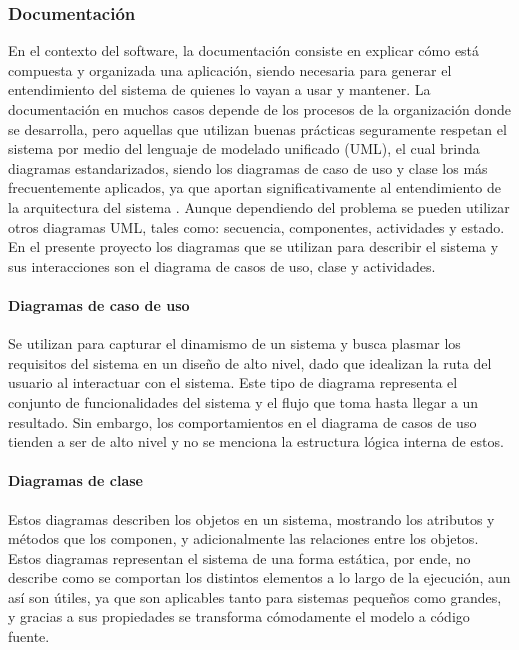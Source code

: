 \subsubsection{Documentación}
En el contexto del software, la documentación consiste en explicar cómo está compuesta y organizada una aplicación, siendo necesaria para generar el entendimiento del sistema de quienes lo vayan a usar y mantener. La documentación en muchos casos depende de los procesos de la organización donde se desarrolla, pero aquellas que utilizan buenas prácticas seguramente respetan el sistema por medio del lenguaje de modelado unificado (UML), el cual brinda diagramas estandarizados, siendo los diagramas de caso de uso y clase los más frecuentemente aplicados, ya que aportan significativamente al entendimiento de la arquitectura del sistema \parencite{Rumbaugh2004}. Aunque dependiendo del problema se pueden utilizar otros diagramas UML, tales como: secuencia, componentes, actividades y estado. 
En el presente proyecto los diagramas que se utilizan para describir el sistema y sus interacciones son el diagrama de casos de uso, clase y actividades.

\paragraph{Diagramas de caso de uso} Se utilizan para capturar el dinamismo de un sistema y busca plasmar los requisitos del sistema en un diseño de alto nivel, dado que idealizan la ruta del usuario al interactuar con el sistema. Este tipo de diagrama representa el conjunto de funcionalidades del sistema y el flujo que toma hasta llegar a un resultado. Sin embargo, los comportamientos en el diagrama de casos de uso tienden a ser de alto nivel y no se menciona la estructura lógica interna de estos. 

\paragraph{Diagramas de clase} Estos diagramas describen los objetos en un sistema, mostrando los atributos y métodos que los componen, y adicionalmente las relaciones entre los objetos. Estos diagramas representan el sistema de una forma estática, por ende, no describe como se comportan los distintos elementos a lo largo de la ejecución, aun así son útiles, ya que son aplicables tanto para sistemas pequeños como grandes, y gracias a sus propiedades se transforma cómodamente el modelo a código fuente.

